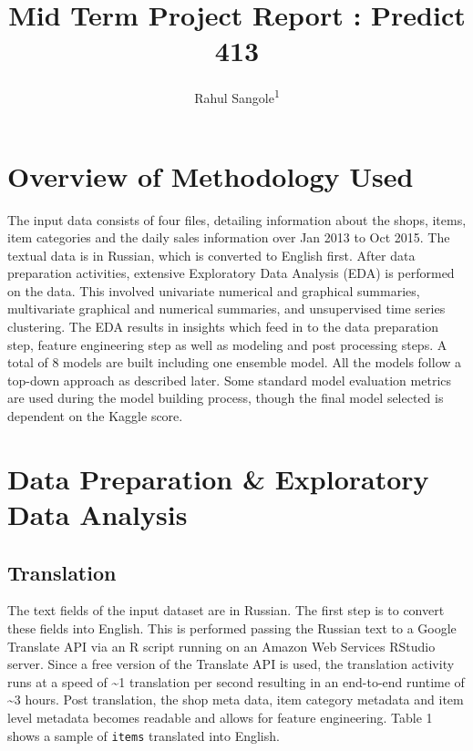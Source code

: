 \documentclass[floatsintext,man]{apa6}
\title{Mid Term Project Report : Predict 413}
\author{Rahul Sangole\textsuperscript{1}}
\affiliation{
    \vspace{0.5cm}
          \textsuperscript{1} Northwestern University  }
\theoremstyle{definition}
\theoremstyle{definition}
\theoremstyle{definition}
\theoremstyle{remark}
\begin{document}
\maketitle

\setcounter{secnumdepth}{0}



\section{Overview of Methodology
Used}\label{overview-of-methodology-used}

The input data consists of four files, detailing information about the
shops, items, item categories and the daily sales information over Jan
2013 to Oct 2015. The textual data is in Russian, which is converted to
English first. After data preparation activities, extensive Exploratory
Data Analysis (EDA) is performed on the data. This involved univariate
numerical and graphical summaries, multivariate graphical and numerical
summaries, and unsupervised time series clustering. The EDA results in
insights which feed in to the data preparation step, feature engineering
step as well as modeling and post processing steps. A total of 8 models
are built including one ensemble model. All the models follow a top-down
approach as described later. Some standard model evaluation metrics are
used during the model building process, though the final model selected
is dependent on the Kaggle score.

\section{Data Preparation \& Exploratory Data
Analysis}\label{data-preparation-exploratory-data-analysis}

\subsection{Translation}\label{translation}

The text fields of the input dataset are in Russian. The first step is
to convert these fields into English. This is performed passing the
Russian text to a Google Translate API via an R script running on an
Amazon Web Services RStudio server. Since a free version of the
Translate API is used, the translation activity runs at a speed of
\textasciitilde{}1 translation per second resulting in an end-to-end
runtime of \textasciitilde{}3 hours. Post translation, the shop meta
data, item category metadata and item level metadata becomes readable
and allows for feature engineering. Table 1 shows a sample of
\texttt{items} translated into English.
\end{document}
